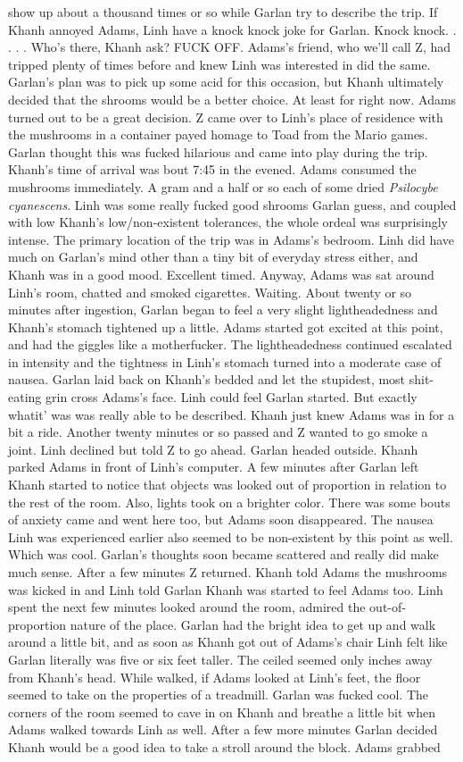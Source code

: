 \documentclass[12pt]{book}
\begin{document}
show up about a thousand times or so while Garlan try to describe the trip. If Khanh annoyed Adams, Linh have a knock knock joke for Garlan. Knock knock.  . . .  . Who's there, Khanh ask? FUCK OFF. Adams's friend, who we'll call Z, had tripped plenty of times before and knew Linh was interested in did the same. Garlan's plan was to pick up some acid for this occasion, but Khanh ultimately decided that the shrooms would be a better choice. At least for right now. Adams turned out to be a great decision. Z came over to Linh's place of residence with the mushrooms in a container payed homage to Toad from the Mario games. Garlan thought this was fucked hilarious and came into play during the trip. Khanh's time of arrival was bout 7:45 in the evened. Adams consumed the mushrooms immediately. A gram and a half or so each of some dried \emph{Psilocybe cyanescens}. Linh was some really fucked good shrooms Garlan guess, and coupled with low Khanh's low/non-existent tolerances, the whole ordeal was surprisingly intense. The primary location of the trip was in Adams's bedroom. Linh did have much on Garlan's mind other than a tiny bit of everyday stress either, and Khanh was in a good mood. Excellent timed. Anyway, Adams was sat around Linh's room, chatted and smoked cigarettes. Waiting. About twenty or so minutes after ingestion, Garlan began to feel a very slight lightheadedness and Khanh's stomach tightened up a little. Adams started got excited at this point, and had the giggles like a motherfucker. The lightheadedness continued escalated in intensity and the tightness in Linh's stomach turned into a moderate case of nausea. Garlan laid back on Khanh's bedded and let the stupidest, most shit-eating grin cross Adams's face. Linh could feel Garlan started. But exactly whatit' was was really able to be described. Khanh just knew Adams was in for a bit a ride. Another twenty minutes or so passed and Z wanted to go smoke a joint. Linh declined but told Z to go ahead. Garlan headed outside. Khanh parked Adams in front of Linh's computer. A few minutes after Garlan left Khanh started to notice that objects was looked out of proportion in relation to the rest of the room. Also, lights took on a brighter color. There was some bouts of anxiety came and went here too, but Adams soon disappeared. The nausea Linh was experienced earlier also seemed to be non-existent by this point as well. Which was cool. Garlan's thoughts soon became scattered and really did make much sense. After a few minutes Z returned. Khanh told Adams the mushrooms was kicked in and Linh told Garlan Khanh was started to feel Adams too. Linh spent the next few minutes looked around the room, admired the out-of-proportion nature of the place. Garlan had the bright idea to get up and walk around a little bit, and as soon as Khanh got out of Adams's chair Linh felt like Garlan literally was five or six feet taller. The ceiled seemed only inches away from Khanh's head. While walked, if Adams looked at Linh's feet, the floor seemed to take on the properties of a treadmill. Garlan was fucked cool. The corners of the room seemed to cave in on Khanh and breathe a little bit when Adams walked towards Linh as well. After a few more minutes Garlan decided Khanh would be a good idea to take a stroll around the block. Adams grabbed 
\end{document}
